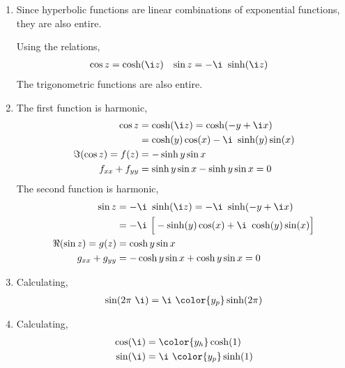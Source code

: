 \begin{enumerate}
    \item Since hyperbolic functions are linear combinations of exponential functions,
          they are also entire. \par
          Using the relations,
          \begin{align}
              \cos z & = \cosh(\i z) & \sin z & = -\i\ \sinh(\i z)
          \end{align}
          The trigonometric functions are also entire.

    \item The first function \textcolor{y_h}{is harmonic},
          \begin{align}
              \cos z               & = \cosh(\i z) = \cosh(-y + \i x)          \\
                                   & = \cosh(y) \cos(x) - \i\ \sinh(y) \sin(x) \\
              \Im{(\cos z)} = f(z) & = -\sinh y \sin x                         \\
              f_{xx} + f_{yy}      & = \sinh y \sin x - \sinh y \sin x = 0
          \end{align}
          The second function \textcolor{y_h}{is harmonic},
          \begin{align}
              \sin z               & = -\i\ \sinh(\i z) = -\i\ \sinh(-y + \i x) \\
                                   & = -\i\ \Big[-\sinh(y) \cos(x)
              + \i\ \cosh(y) \sin(x)\Big]                                       \\
              \Re{(\sin z)} = g(z) & = \cosh y \sin x                           \\
              g_{xx} + g_{yy}      & = -\cosh y \sin x + \cosh y \sin x = 0
          \end{align}

    \item Calculating,
          \begin{align}
              \sin(2\pi\ \i) & = \i\ \color{y_p} \sinh(2\pi) \\
          \end{align}

    \item Calculating,
          \begin{align}
              \cos(\i) & = \color{y_h} \cosh(1)     \\
              \sin(\i) & = \i\ \color{y_p} \sinh(1)
          \end{align}


\end{enumerate}
